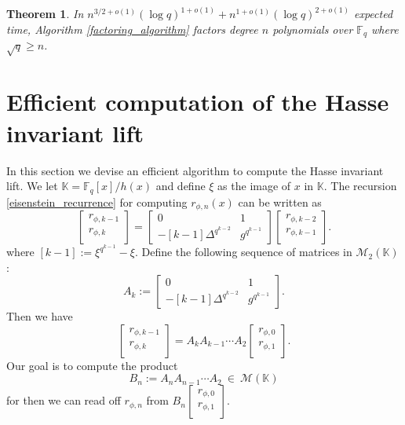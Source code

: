 \documentclass{article}
\theoremstyle{plain}
\newtheorem{theorem}{Theorem}
\theoremstyle{definition}
\def\F{\ensuremath{\mathbb{F}}}
\def\K{\ensuremath{\mathbb{K}}}
\begin{document}
\begin{theorem} In $n^{3/2+o(1)} (\log q)^{1+o(1)} + n^{1+o(1)} (\log q)^{2+o(1)}$ expected time, Algorithm \ref{factoring_algorithm} factors degree $n$ polynomials over $\F_q$ where $\sqrt{q} \geq n$. 
\end{theorem}

\section{Efficient computation of the Hasse invariant lift}
\label{sec:hasse}

In this section we devise an efficient algorithm to compute the Hasse invariant lift. We let $\K = \F_q[x]/h(x)$ and define $\xi$ as the image of $x$ in $\K$. The recursion \ref{eisenstein_recurrence} for computing $r_{\phi,n}(x)$ can be written as
\[
\begin{bmatrix}
r_{\phi,k - 1} \\
r_{\phi,k} \\
\end{bmatrix} = 
\begin{bmatrix}
0 & 1 \\
-[k - 1]\Delta^{q^{k - 2}} & g^{q^{k - 1}}
\end{bmatrix}
\begin{bmatrix}
r_{\phi,k - 2} \\
r_{\phi,k - 1} \\
\end{bmatrix}.
\]
where $[k - 1]:=\xi^{q^{k - 1}}-\xi$. Define the following sequence of matrices in 
$\mathscr{M}_2(\K)$:
\[
A_k :=\begin{bmatrix}
0 & 1 \\
-[k - 1]\Delta^{q^{k - 2}} & g^{q^{k - 1}}
\end{bmatrix}.
\]
Then we have
\[
\begin{bmatrix}
r_{\phi,k - 1} \\
r_{\phi,k} \\
\end{bmatrix} = 
A_kA_{k - 1} \cdots A_2
\begin{bmatrix}
r_{\phi,0} \\
r_{\phi,1} \\
\end{bmatrix}.
\]
Our goal is to compute the product 
\[B_n := A_nA_{n - 1} \cdots A_2 ~ \in ~ \mathscr{M}(\K)\]
for then we can read off $r_{\phi,n}$ from $B_n\begin{bmatrix}
r_{\phi,0} \\
r_{\phi,1} \\
\end{bmatrix}.$ 
\end{document}

